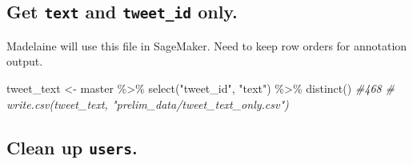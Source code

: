 \documentclass[
]{article}
\newenvironment{Shaded}{\begin{snugshade}}{\end{snugshade}}
\newcommand{\CommentTok}[1]{\textcolor[rgb]{0.56,0.35,0.01}{\textit{#1}}}
\newcommand{\FunctionTok}[1]{\textcolor[rgb]{0.00,0.00,0.00}{#1}}
\newcommand{\NormalTok}[1]{#1}
\newcommand{\OtherTok}[1]{\textcolor[rgb]{0.56,0.35,0.01}{#1}}
\newcommand{\SpecialCharTok}[1]{\textcolor[rgb]{0.00,0.00,0.00}{#1}}
\newcommand{\StringTok}[1]{\textcolor[rgb]{0.31,0.60,0.02}{#1}}
\begin{document}
\hypertarget{get-text-and-tweet_id-only.}{%
\subsection{\texorpdfstring{Get \texttt{text} and \texttt{tweet\_id}
only.}{Get text and tweet\_id only.}}\label{get-text-and-tweet_id-only.}}

Madelaine will use this file in SageMaker. Need to keep row orders for
annotation output.

\begin{Shaded}
\begin{Highlighting}[]
\NormalTok{tweet\_text }\OtherTok{\textless{}{-}}\NormalTok{ master }\SpecialCharTok{\%\textgreater{}\%} \FunctionTok{select}\NormalTok{(}\StringTok{"tweet\_id"}\NormalTok{, }\StringTok{"text"}\NormalTok{) }\SpecialCharTok{\%\textgreater{}\%} \FunctionTok{distinct}\NormalTok{() }\CommentTok{\#468 }
\CommentTok{\# write.csv(tweet\_text, "prelim\_data/tweet\_text\_only.csv")}
\end{Highlighting}
\end{Shaded}

\hypertarget{clean-up-users.}{%
\subsection{\texorpdfstring{Clean up
\texttt{users}.}{Clean up users.}}\label{clean-up-users.}}
\end{document}
